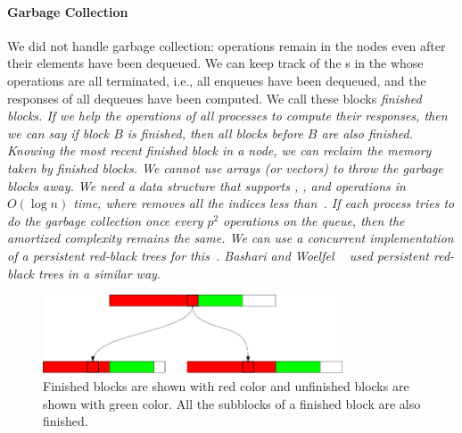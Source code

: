 \paragraph{Garbage Collection}
We did not handle garbage collection:  operations  remain in the nodes even after their elements have been dequeued.
We can keep track of the s in the  whose operations are all terminated, i.e., all enqueues have been dequeued, and the responses of all dequeues have been computed. We call these blocks \it{finished blocks}. If we help the operations of all processes to compute their responses, then we can say if block $B$ is finished, then all blocks before $B$ are also finished. Knowing the most recent finished block in a node, we can reclaim the memory taken by finished blocks. We cannot use arrays (or vectors) to throw the garbage blocks away. We need a data structure that supports , ,  and  operations in $O(\log n)$ time, where  removes all the indices less than~. If each process tries to do the garbage collection once every $p^2$ operations on the queue, then the amortized complexity remains the same. We can use a concurrent implementation of a persistent red-black trees for this~\cite{DBLP:conf/afp/Okasaki96}. Bashari and Woelfel ~\cite{DBLP:conf/podc/BashariW21} used persistent red-black trees in a similar way.


\begin{figure}[hbt]  
  \center\includegraphics[width=3.5in]{pics/finishedBlocks.png}
  \caption[Blocks that can be safely garbage collected.]{Finished blocks are shown with red color and unfinished blocks are shown with green color. All the subblocks of a finished block are also finished.}
  \label{fig::finishedBlock}
\end{figure}

